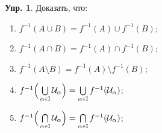 \documentclass[12pt]{article}
\newcommand{\MI}{\mathrm{I}}
\newcommand{\MU}{\mathcal{U}}
\theoremstyle{definition}
\newtheorem{exrc}{Упр.}
\newcommand{\smallerrel}[1]{\mathrel{\mathpalette\smallerrelaux{#1}}}
\newcommand{\smallerrelaux}[2]{\raisebox{.1ex}{\scalebox{.75}{$#1#2$}}}
\newcommand{\smallin}{\smallerrel{\in}}
\begin{document}
\begin{exrc}
	Доказать, что:
	\begin{enumerate}[label ={(\arabic*)}]
		\item $f^{-1}(A \cup B) = f^{-1}(A) \cup f^{-1}(B)$;
		\item $f^{-1}(A \cap B) = f^{-1}(A) \cap f^{-1}(B)$;
		\item $f^{-1}(A \setminus B) = f^{-1}(A) \setminus f^{-1}(B)$;
		\item $\textstyle f^{-1}\Big(\bigcup\limits_{\alpha \smallin \MI}\MU_\alpha\Big) = \textstyle \bigcup\limits_{\alpha \smallin \MI}f^{-1}(\MU_\alpha)$;
		\item $\textstyle f^{-1}\Big(\bigcap\limits_{\alpha \smallin \MI}\MU_\alpha\Big) = \textstyle \bigcap\limits_{\alpha \smallin \MI}f^{-1}(\MU_\alpha)$;
	\end{enumerate}
\end{exrc}
\end{document}
